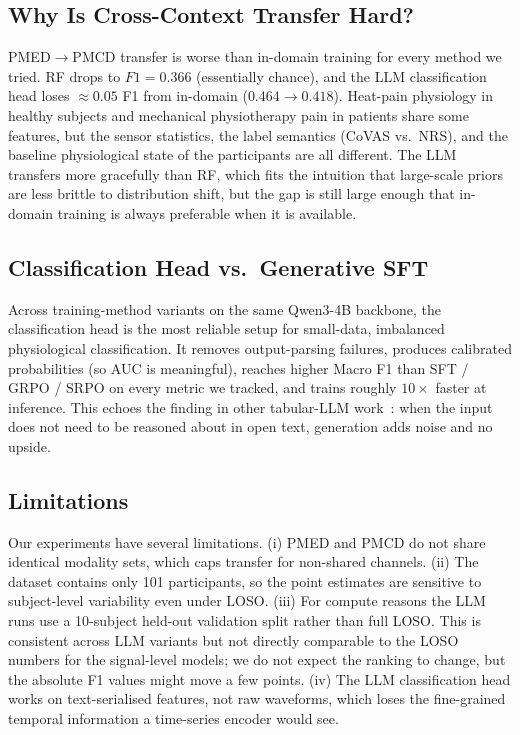 \documentclass{article}
\begin{document}
\subsection{Why Is Cross-Context Transfer Hard?}

PMED$\to$PMCD transfer is worse than in-domain training for every method we tried. RF drops to $F1 = 0.366$ (essentially chance), and the LLM classification head loses $\approx 0.05$ F1 from in-domain ($0.464 \to 0.418$). Heat-pain physiology in healthy subjects and mechanical physiotherapy pain in patients share some features, but the sensor statistics, the label semantics (CoVAS vs.\ NRS), and the baseline physiological state of the participants are all different. The LLM transfers more gracefully than RF, which fits the intuition that large-scale priors are less brittle to distribution shift, but the gap is still large enough that in-domain training is always preferable when it is available.

\subsection{Classification Head vs.\ Generative SFT}

Across training-method variants on the same Qwen3-4B backbone, the classification head is the most reliable setup for small-data, imbalanced physiological classification. It removes output-parsing failures, produces calibrated probabilities (so AUC is meaningful), reaches higher Macro F1 than SFT / GRPO / SRPO on every metric we tracked, and trains roughly $10\times$ faster at inference. This echoes the finding in other tabular-LLM work~\citep{hegselmann2023tabllm}: when the input does not need to be reasoned about in open text, generation adds noise and no upside.

\subsection{Limitations}

Our experiments have several limitations. (i) PMED and PMCD do not share identical modality sets, which caps transfer for non-shared channels. (ii) The dataset contains only 101 participants, so the point estimates are sensitive to subject-level variability even under LOSO. (iii) For compute reasons the LLM runs use a 10-subject held-out validation split rather than full LOSO. This is consistent across LLM variants but not directly comparable to the LOSO numbers for the signal-level models; we do not expect the ranking to change, but the absolute F1 values might move a few points. (iv) The LLM classification head works on text-serialised features, not raw waveforms, which loses the fine-grained temporal information a time-series encoder would see.
\end{document}
